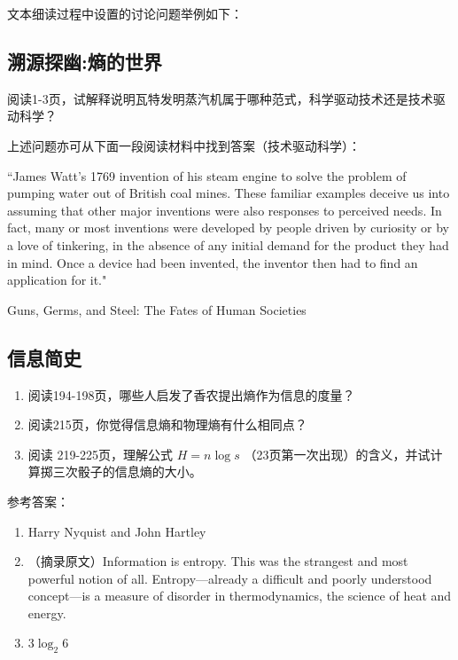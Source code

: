\documentclass[12pt]{ctexart}
\begin{document}
文本细读过程中设置的讨论问题举例如下：


\subsection{溯源探幽:熵的世界}

阅读1-3页，试解释说明瓦特发明蒸汽机属于哪种范式，科学驱动技术还是技术驱动科学？

上述问题亦可从下面一段阅读材料中找到答案（技术驱动科学）：

``James Watt’s 1769 invention of his steam engine to solve the problem of pumping water out of British coal mines.
These familiar examples deceive us into assuming that other major inventions were also responses to perceived needs. In fact, many or most inventions were developed by people driven by curiosity or by a love of tinkering, in the absence of any initial demand for the product they had in mind. Once a device had been invented, the inventor then had to find an application for it."
\begin{flushright}
Guns, Germs, and Steel: The Fates of Human Societies
\end{flushright}

\subsection{信息简史}
\begin{enumerate}
  \item 阅读194-198页，哪些人启发了香农提出熵作为信息的度量？
  \item 阅读215页，你觉得信息熵和物理熵有什么相同点？
  \item 阅读 219-225页，理解公式 $H=n\log s$ （23页第一次出现）的含义，并试计算掷三次骰子的信息熵的大小。
\end{enumerate}

参考答案：
\begin{enumerate}
  \item Harry Nyquist and John Hartley
  \item （摘录原文）Information is entropy. This was the strangest and most powerful notion of all. Entropy—already a difficult and poorly understood concept—is a measure of disorder in thermodynamics, the science of heat and energy.
  \item $3\log_2 6$
\end{enumerate}
\end{document}
